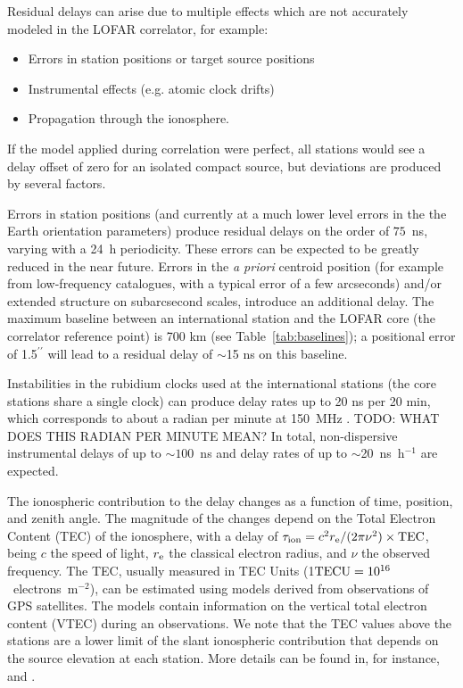 \documentclass[graybox]{svmult}
\begin{document}
Residual delays can arise due to multiple effects which are not accurately modeled in the LOFAR correlator, 
for example:
\begin{itemize}
\item Errors in station positions or target source positions
\item Instrumental effects (e.g. atomic clock drifts)
\item Propagation through the ionosphere.
\end{itemize}
If the model applied during
correlation were perfect, all stations would see a delay offset of zero for an
isolated compact source, but deviations are produced by several factors. 

Errors in station positions (and currently at a much lower level errors in the
the Earth orientation parameters) produce residual delays on the order of $75$~ns,
varying with a 24~h periodicity. These errors can be expected to be greatly reduced 
in the near future.  
Errors in the {\em a priori} centroid position (for example from low-frequency
catalogues, with a typical error of a few arcseconds) and/or extended structure
on subarcsecond scales, introduce an additional delay.  The maximum baseline
between an international station and the LOFAR core (the correlator reference
point) is 700 km (see Table~\ref{tab:baselines}); a positional error of
1.5$^{\prime\prime}$ will lead to a residual delay of $\sim$15 ns on this
baseline.

Instabilities in the rubidium clocks used at the international stations (the
core stations share a single clock) can produce delay rates up to 20 ns per 20
min, which corresponds to about a radian per minute at 150~MHz
\citep{vanhaarlem13}.  
TODO: WHAT DOES THIS RADIAN PER MINUTE MEAN?
In total, non-dispersive instrumental delays of up to $\sim100$~ns and delay
rates of up to $\sim$20~ns~h$^{-1}$ are expected.  

The ionospheric contribution to the delay changes as a function of time,
position, and zenith angle.  The magnitude of the changes depend on the Total
Electron Content (TEC) of the ionosphere, with a delay of $\tau_{\rm
ion}=c^{2}r_{\rm e}/(2\pi\nu^{2})\times {\rm TEC}$, being $c$ the speed of
light, $r_{\rm e}$ the classical electron radius, and $\nu$ the observed
frequency. The TEC, usually measured in TEC Units (1${\rm
TECU}=10^{16}$~electrons~m$^{-2}$), can be estimated using models derived from
observations of GPS satellites.  
The models contain
information on the vertical total electron content (VTEC) during an
observations. We note that the TEC values above the stations are a lower limit
of the slant ionospheric contribution that depends on the source elevation at
each station. More details can be found in, for instance, \cite{nigl07} and
\cite{sotomayor13a}.
\end{document}
